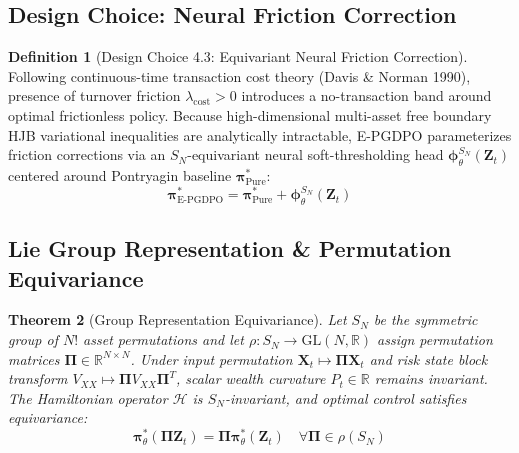 \documentclass[11pt,a4paper]{article}
\theoremstyle{plain}
\newtheorem{theorem}{Theorem}[section]
\theoremstyle{definition}
\newtheorem{definition}[theorem]{Definition}
\theoremstyle{remark}
\begin{document}
\subsection{Design Choice: Neural Friction Correction}

\begin{definition}[Design Choice 4.3: Equivariant Neural Friction Correction]
\label{def:friction_head}
Following continuous-time transaction cost theory (Davis \& Norman 1990), presence of turnover friction $\lambda_{\text{cost}} > 0$ introduces a no-transaction band around optimal frictionless policy. Because high-dimensional multi-asset free boundary HJB variational inequalities are analytically intractable, E-PGDPO parameterizes friction corrections via an $S_N$-equivariant neural soft-thresholding head $\mathbf{\phi}_\theta^{S_N}(\mathbf{Z}_t)$ centered around Pontryagin baseline $\mathbf{\pi}_{\text{Pure}}^*$:
\begin{equation}
    \mathbf{\pi}_{\text{E-PGDPO}}^* = \mathbf{\pi}_{\text{Pure}}^* + \mathbf{\phi}_\theta^{S_N}(\mathbf{Z}_t)
\end{equation}
\end{definition}

\subsection{Lie Group Representation \& Permutation Equivariance}

\begin{theorem}[Group Representation Equivariance]
\label{thm:equivariance}
Let $S_N$ be the symmetric group of $N!$ asset permutations and let $\rho: S_N \to \text{GL}(N, \mathbb{R})$ assign permutation matrices $\mathbf{\Pi} \in \mathbb{R}^{N \times N}$. Under input permutation $\mathbf{X}_t \mapsto \mathbf{\Pi} \mathbf{X}_t$ and risk state block transform $V_{XX} \mapsto \mathbf{\Pi} V_{XX} \mathbf{\Pi}^T$, scalar wealth curvature $P_t \in \mathbb{R}$ remains invariant. The Hamiltonian operator $\mathcal{H}$ is $S_N$-invariant, and optimal control satisfies equivariance:
\begin{equation}
    \mathbf{\pi}_\theta^*(\mathbf{\Pi} \mathbf{Z}_t) = \mathbf{\Pi} \mathbf{\pi}_\theta^*(\mathbf{Z}_t) \quad \forall \mathbf{\Pi} \in \rho(S_N)
\end{equation}
\end{theorem}
\end{document}
